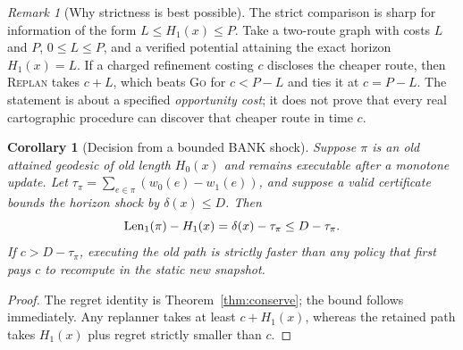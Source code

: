 \documentclass[11pt]{article}
\newtheorem{corollary}[theorem]{Corollary}
\theoremstyle{definition}\newtheorem{definition}[theorem]{Definition}\newtheorem{assumption}[theorem]{Assumption}
\theoremstyle{remark}\newtheorem{remark}[theorem]{Remark}
\begin{document}
\begin{remark}[Why strictness is best possible]\label{rem:sharp}
The strict comparison is sharp for information of the form $L\leq H_1(x)\leq P$. Take a two-route graph with costs $L$ and $P$, $0\leq L\leq P$, and a verified potential attaining the exact horizon $H_1(x)=L$. If a charged refinement costing $c$ discloses the cheaper route, then \textsc{Replan} takes $c+L$, which beats \textsc{Go} for $c<P-L$ and ties it at $c=P-L$. The statement is about a specified \emph{opportunity cost}; it does not prove that every real cartographic procedure can discover that cheaper route in time $c$.
\end{remark}

\begin{corollary}[Decision from a bounded BANK shock]\label{cor:shockstop}
Suppose $\pi$ is an old attained geodesic of old length $H_0(x)$ and remains executable after a monotone update. Let $\tau_{\pi}=\sum_{e\in\pi}(w_0(e)-w_1(e))$, and suppose a valid certificate bounds the horizon shock by $\delta(x)\leq D$. Then
\[
\operatorname{Len}_1(\pi)-H_1(x)=\delta(x)-\tau_{\pi}\leq D-\tau_{\pi}.
\]
If $c>D-\tau_{\pi}$, executing the old path is strictly faster than any policy that first pays $c$ to recompute in the static new snapshot.
\end{corollary}
\begin{proof}
The regret identity is Theorem~\ref{thm:conserve}; the bound follows immediately. Any replanner takes at least $c+H_1(x)$, whereas the retained path takes $H_1(x)$ plus regret strictly smaller than $c$.
\end{proof}
\par
\end{document}
